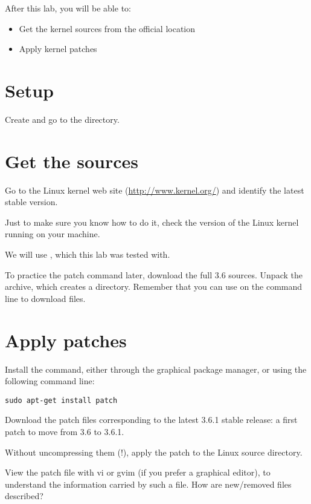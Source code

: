 
After this lab, you will be able to:
\begin{itemize}
\item Get the kernel sources from the official location
\item Apply kernel patches
\end{itemize}

\section{Setup}

Create and go to the  directory.

\section{Get the sources}

Go to the Linux kernel web site (\url{http://www.kernel.org/}) and
identify the latest stable version.

Just to make sure you know how to do it, check the version of the
Linux kernel running on your machine.

We will use , which this lab was tested with.

To practice the patch command later, download the full 3.6
sources. Unpack the archive, which creates a 
directory. Remember that you can use  on the command
line to download files.

\section{Apply patches}

Install the  command, either through the graphical package
manager, or using the following command line:

\begin{verbatim}
sudo apt-get install patch
\end{verbatim}

Download the patch files corresponding to the latest 3.6.1 stable
release: a first patch to move from 3.6 to 3.6.1.

Without uncompressing them (!), apply the patch to the Linux
source directory.

View the patch file with vi or gvim (if you prefer a
graphical editor), to understand the information carried by such a
file. How are new/removed files described?

